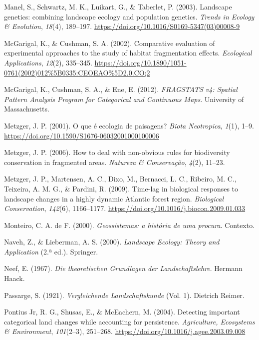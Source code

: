 \documentclass[
  portuguese,
  11pt,
  a4paper,
  open=any]{scrbook}
\newlength{\cslhangindent}
\newenvironment{CSLReferences}[2] %
 {\begin{list}{}{%
  \setlength{\itemindent}{0pt}
  \setlength{\leftmargin}{0pt}
  \setlength{\parsep}{0pt}
  \ifodd #1
   \setlength{\leftmargin}{\cslhangindent}
   \setlength{\itemindent}{-1\cslhangindent}
  \fi
  \setlength{\itemsep}{#2\baselineskip}}}
 {\end{list}}
\begin{document}
\begin{CSLReferences}{1}{0}
Manel, S., Schwartz, M. K., Luikart, G., \& Taberlet, P. (2003).
Landscape genetics: combining landscape ecology and population genetics.
\emph{Trends in Ecology \& Evolution}, \emph{18}(4), 189--197.
\url{https://doi.org/10.1016/S0169-5347(03)00008-9}

McGarigal, K., \& Cushman, S. A. (2002). Comparative evaluation of
experimental approaches to the study of habitat fragmentation effects.
\emph{Ecological Applications}, \emph{12}(2), 335--345.
\url{https://doi.org/10.1890/1051-0761(2002)012\%5B0335:CEOEAO\%5D2.0.CO;2}

McGarigal, K., Cushman, S. A., \& Ene, E. (2012). \emph{FRAGSTATS v4:
Spatial Pattern Analysis Program for Categorical and Continuous Maps}.
University of Massachusetts.

Metzger, J. P. (2001). O que é ecologia de paisagens? \emph{Biota
Neotropica}, \emph{1}(1), 1--9.
\url{https://doi.org/10.1590/S1676-06032001000100006}

Metzger, J. P. (2006). How to deal with non-obvious rules for
biodiversity conservation in fragmented areas. \emph{Natureza \&
Conservação}, \emph{4}(2), 11--23.

Metzger, J. P., Martensen, A. C., Dixo, M., Bernacci, L. C., Ribeiro, M.
C., Teixeira, A. M. G., \& Pardini, R. (2009). Time-lag in biological
responses to landscape changes in a highly dynamic Atlantic forest
region. \emph{Biological Conservation}, \emph{142}(6), 1166--1177.
\url{https://doi.org/10.1016/j.biocon.2009.01.033}

Monteiro, C. A. de F. (2000). \emph{Geossistemas: a história de uma
procura}. Contexto.

Naveh, Z., \& Lieberman, A. S. (2000). \emph{Landscape Ecology: Theory
and Application} (2.ª ed.). Springer.

Neef, E. (1967). \emph{Die theoretischen Grundlagen der
Landschaftslehre}. Hermann Haack.

Passarge, S. (1921). \emph{Vergleichende Landschaftskunde} (Vol. 1).
Dietrich Reimer.

Pontius Jr, R. G., Shusas, E., \& McEachern, M. (2004). Detecting
important categorical land changes while accounting for persistence.
\emph{Agriculture, Ecosystems \& Environment}, \emph{101}(2--3),
251--268. \url{https://doi.org/10.1016/j.agee.2003.09.008}


\end{CSLReferences}
\end{document}
